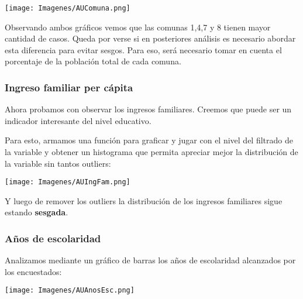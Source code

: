 \documentclass[a4paper]{article}
\begin{document}
            \begin{center}
                \texttt{[image: Imagenes/AUComuna.png]}    
            \end{center}
 
            Observando ambos gráficos vemos que las comunas 1,4,7 y 8 tienen mayor cantidad de casos. Queda por verse si en posteriores análisis es necesario abordar esta diferencia para evitar sesgos. Para eso, será necesario tomar en cuenta el porcentaje de la población total de cada comuna.
           
            \subsubsection{Ingreso familiar per cápita}
           
            Ahora probamos con observar los ingresos familiares. Creemos que puede ser un indicador interesante del nivel educativo.
           
            Para esto, armamos una función para graficar y jugar con el nivel del filtrado de la variable y obtener un histograma que permita apreciar mejor la distribución de la variable sin tantos outliers:
           
            \begin{center}
                \texttt{[image: Imagenes/AUIngFam.png]}
            \end{center}
           
           
 
            Y luego de remover los outliers la distribución de los ingresos familiares sigue estando \textbf{sesgada}.
 
            \newpage

            \subsubsection{Años de escolaridad}
           
            Analizamos mediante un gráfico de barras los años de escolaridad alcanzados por los encuestados:
           
            \begin{center}
                \texttt{[image: Imagenes/AUAnosEsc.png]}
            \end{center}
           
\end{document}
